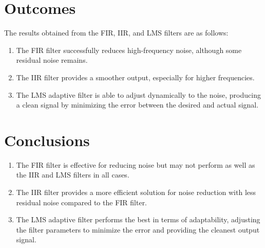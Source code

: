 \documentclass[a4paper,12pt]{article}
\begin{document}
\section{Outcomes}
The results obtained from the FIR, IIR, and LMS filters are as follows:
\begin{enumerate}
    \item The FIR filter successfully reduces high-frequency noise, although some residual noise remains.
    \item The IIR filter provides a smoother output, especially for higher frequencies.
    \item The LMS adaptive filter is able to adjust dynamically to the noise, producing a clean signal by minimizing the error between the desired and actual signal.
\end{enumerate}
\newpage
\section{Conclusions}
\begin{enumerate}
    \item The FIR filter is effective for reducing noise but may not perform as well as the IIR and LMS filters in all cases.
    \item The IIR filter provides a more efficient solution for noise reduction with less residual noise compared to the FIR filter.
    \item The LMS adaptive filter performs the best in terms of adaptability, adjusting the filter parameters to minimize the error and providing the cleanest output signal.
\end{enumerate}
\end{document}
